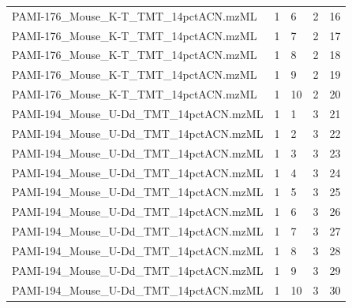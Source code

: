 \begin{table}[!ht]
\begin{tabular*}{0.95\textwidth}{lllll}
PAMI-176\_Mouse\_K-T\_TMT\_14pctACN.mzML  & 1                  & 6                     & 2                & 16        \\
PAMI-176\_Mouse\_K-T\_TMT\_14pctACN.mzML  & 1                  & 7                     & 2                & 17        \\
PAMI-176\_Mouse\_K-T\_TMT\_14pctACN.mzML  & 1                  & 8                     & 2                & 18        \\
PAMI-176\_Mouse\_K-T\_TMT\_14pctACN.mzML  & 1                  & 9                     & 2                & 19        \\
PAMI-176\_Mouse\_K-T\_TMT\_14pctACN.mzML  & 1                  & 10                    & 2                & 20        \\
PAMI-194\_Mouse\_U-Dd\_TMT\_14pctACN.mzML & 1                  & 1                     & 3                & 21        \\
PAMI-194\_Mouse\_U-Dd\_TMT\_14pctACN.mzML & 1                  & 2                     & 3                & 22        \\
PAMI-194\_Mouse\_U-Dd\_TMT\_14pctACN.mzML & 1                  & 3                     & 3                & 23        \\
PAMI-194\_Mouse\_U-Dd\_TMT\_14pctACN.mzML & 1                  & 4                     & 3                & 24        \\
PAMI-194\_Mouse\_U-Dd\_TMT\_14pctACN.mzML & 1                  & 5                     & 3                & 25        \\
PAMI-194\_Mouse\_U-Dd\_TMT\_14pctACN.mzML & 1                  & 6                     & 3                & 26        \\
PAMI-194\_Mouse\_U-Dd\_TMT\_14pctACN.mzML & 1                  & 7                     & 3                & 27        \\
PAMI-194\_Mouse\_U-Dd\_TMT\_14pctACN.mzML & 1                  & 8                     & 3                & 28        \\
PAMI-194\_Mouse\_U-Dd\_TMT\_14pctACN.mzML & 1                  & 9                     & 3                & 29        \\
PAMI-194\_Mouse\_U-Dd\_TMT\_14pctACN.mzML & 1                  & 10                    & 3                & 30        \\
\end{tabular*}
\end{table}

